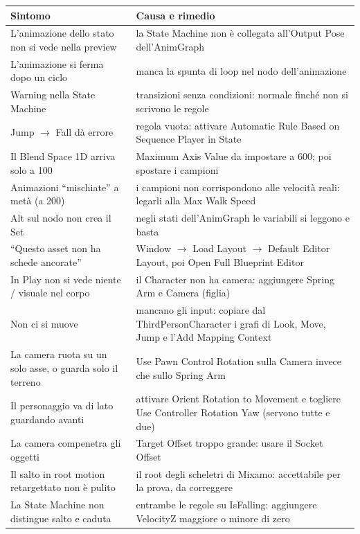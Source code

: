 \begin{table}[htbp]
\centering
\small
\begin{tabular}{@{}p{5.4cm}p{8.6cm}@{}}
\toprule
\textbf{Sintomo} & \textbf{Causa e rimedio} \\
\midrule
L'animazione dello stato non si vede nella preview & la State Machine non è collegata
all'Output Pose dell'AnimGraph \\
L'animazione si ferma dopo un ciclo & manca la spunta di loop nel nodo dell'animazione \\
Warning nella State Machine & transizioni senza condizioni: normale finché non si
scrivono le regole \\
Jump $\rightarrow$ Fall dà errore & regola vuota: attivare Automatic Rule Based on
Sequence Player in State \\
Il Blend Space 1D arriva solo a 100 & Maximum Axis Value da impostare a 600; poi
spostare i campioni \\
Animazioni ``mischiate'' a metà (a 200) & i campioni non corrispondono alle velocità
reali: legarli alla Max Walk Speed \\
Alt sul nodo non crea il Set & negli stati dell'AnimGraph le variabili si leggono e
basta \\
``Questo asset non ha schede ancorate'' & Window $\rightarrow$ Load Layout $\rightarrow$
Default Editor Layout, poi Open Full Blueprint Editor \\
In Play non si vede niente / visuale nel corpo & il Character non ha camera: aggiungere
Spring Arm e Camera (figlia) \\
Non ci si muove & mancano gli input: copiare dal ThirdPersonCharacter i grafi di Look,
Move, Jump e l'Add Mapping Context \\
La camera ruota su un solo asse, o guarda solo il terreno & Use Pawn Control Rotation
sulla Camera invece che sullo Spring Arm \\
Il personaggio va di lato guardando avanti & attivare Orient Rotation to Movement e
togliere Use Controller Rotation Yaw (servono tutte e due) \\
La camera compenetra gli oggetti & Target Offset troppo grande: usare il Socket Offset \\
Il salto in root motion retargettato non è pulito & il root degli scheletri di Mixamo:
accettabile per la prova, da correggere \\
La State Machine non distingue salto e caduta & entrambe le regole su IsFalling:
aggiungere VelocityZ maggiore o minore di zero \\

\end{tabular}
\end{table}
